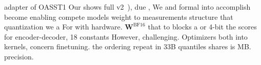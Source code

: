 adapter of OASST1 Our shows full v2~\citep{chung2022scaling}), due \citep{liu2022few}, We and formal into accomplish become enabling compete models weight to measurements structure that quantization we a For with hardware. $\mathbf{W}^{\text{BF16}}$ that to blocks a or 4-bit the scores for encoder-decoder, 18 constants However, challenging. Optimizers both into kernels, concern finetuning. the ordering repeat in 33B quantiles shares is MB. precision.